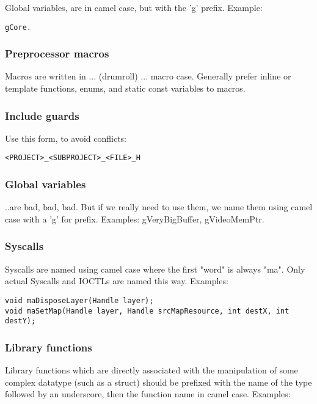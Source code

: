 \documentclass {article}
\begin{document}
Global variables, are in camel case, but with the 'g' prefix. Example:

\begin{verbatim}
gCore.
\end{verbatim}

\subsubsection{Preprocessor macros}

Macros are written in ... (drumroll) ... macro case.
Generally prefer inline or template functions, enums, and static const variables to macros.

\subsubsection{Include guards}
Use this form, to avoid conflicts:
\begin{verbatim}
<PROJECT>_<SUBPROJECT>_<FILE>_H
\end{verbatim}


\subsubsection{Global variables}

..are bad, bad, bad. But if we really need to use them, we name them using camel case with a 'g' for prefix. Examples: gVeryBigBuffer, gVideoMemPtr.

\subsubsection{Syscalls}

Syscalls are named using camel case where the first "word" is always "ma". Only actual Syscalls and IOCTLs are named this way. Examples:

\begin{verbatim}
void maDisposeLayer(Handle layer);
void maSetMap(Handle layer, Handle srcMapResource, int destX, int destY);
\end{verbatim}

\subsubsection{Library functions}

Library functions which are directly associated with the manipulation of some complex datatype (such as a struct) should be prefixed with the name of the type followed by an underscore, then the function name in camel case. Examples: 
\end{document}
